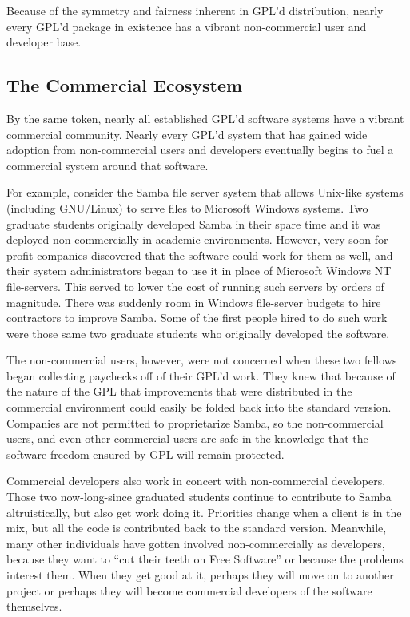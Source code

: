 \documentclass[12pt]{report}
\begin{document}
Because of the symmetry and fairness inherent in GPL'd distribution,
nearly every GPL'd package in existence has a vibrant non-commercial user
and developer base.

\subsection{The Commercial Ecosystem}

By the same token, nearly all established GPL'd software systems have a
vibrant commercial community.  Nearly every GPL'd system that has gained
wide adoption from non-commercial users and developers eventually begins
to fuel a commercial system around that software.

For example, consider the Samba file server system that allows Unix-like
systems (including GNU/Linux) to serve files to Microsoft Windows systems.
Two graduate students originally developed Samba in their spare time and
it was deployed non-commercially in academic environments.  However, very
soon for-profit companies discovered that the software could work for them
as well, and their system administrators began to use it in place of
Microsoft Windows NT file-servers.  This served to lower the cost of
running such servers by orders of magnitude.  There was suddenly room in
Windows file-server budgets to hire contractors to improve Samba.  Some of
the first people hired to do such work were those same two graduate
students who originally developed the software.

The non-commercial users, however, were not concerned when these two
fellows began collecting paychecks off of their GPL'd work.  They knew
that because of the nature of the GPL that improvements that were
distributed in the commercial environment could easily be folded back into
the standard version.  Companies are not permitted to proprietarize
Samba, so the non-commercial users, and even other commercial users are
safe in the knowledge that the software freedom ensured by GPL will remain
protected.

Commercial developers also work in concert with non-commercial developers.
Those two now-long-since graduated students continue to contribute to
Samba altruistically, but also get work doing it.  Priorities change when a
client is in the mix, but all the code is contributed back to the
standard version.  Meanwhile, many other individuals have gotten involved
non-commercially as developers, because they want to ``cut their teeth on
Free Software'' or because the problems interest them.  When they get good
at it, perhaps they will move on to another project or perhaps they will
become commercial developers of the software themselves.
\end{document}
